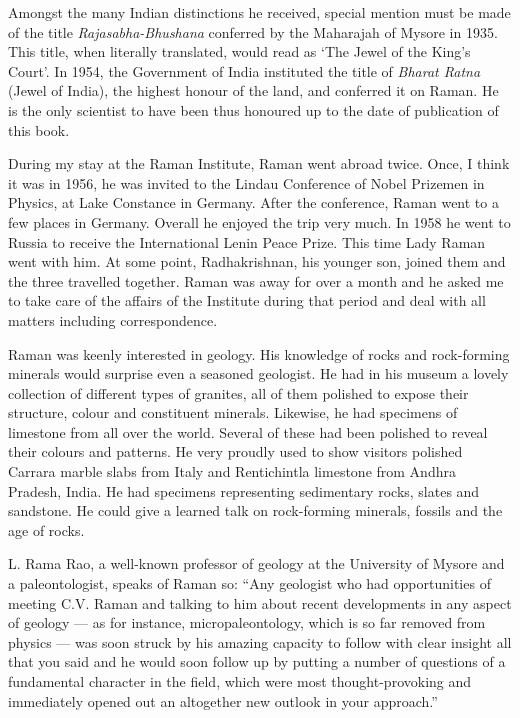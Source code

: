 Amongst the many Indian distinctions he received, special mention must be made of the title {\em Rajasabha-Bhushana} conferred by the Maharajah of Mysore in 1935. This title, when literally translated, would read as `The Jewel of the King's Court'. In 1954, the Government of India instituted the title of {\em Bharat Ratna} (Jewel of India), the highest honour of the land, and conferred it on Raman. He is the only scientist to have been thus honoured up to the date of publication of this book.

During my stay at the Raman Institute, Raman went abroad twice. Once, I think it was in 1956, he was invited to the Lindau
Conference of Nobel Prizemen in Physics, at Lake Constance in Germany. After the conference, Raman went to a few places in Germany. Overall he enjoyed the trip very much. In 1958 he went to Russia to receive the International Lenin Peace Prize.
 This time Lady Raman went with him. At some point, Radhakrishnan, his younger son, joined them and the three travelled together. Raman was away for over a month and he asked me to take care of the affairs of the Institute during that period and deal with all matters including correspondence.

\medskip
{}
\smallskip



\noindent
Raman was keenly interested in geology. His knowledge of rocks and rock-forming minerals would surprise even a seasoned \hbox{geologist}. He had in his museum a lovely collection of different types of granites, all of them polished to expose their structure, colour and constituent minerals. Likewise, he had specimens of limestone from all over the world. Several of these had been polished to reveal their colours and patterns. He very proudly used to show visitors polished Carrara marble slabs from Italy and Rentichintla limestone from Andhra Pradesh, India. He had specimens representing sedimentary rocks, slates and sandstone. He could give a learned talk on rock-forming minerals, fossils and the age of rocks.

L. Rama Rao, a well-known professor of geology at the University of Mysore and a paleontologist, speaks of Raman so: ``Any geologist who had opportunities of meeting C.V. Raman and talking to him about recent developments in any aspect of geology --- as for instance, micropaleontology, which is so far removed from physics --- was soon struck by his amazing capacity to follow with clear insight all that you said and he would soon follow up by putting a number of questions of a fundamental character in the field, which were most thought-provoking and immediately opened out an altogether new outlook in your approach.''

